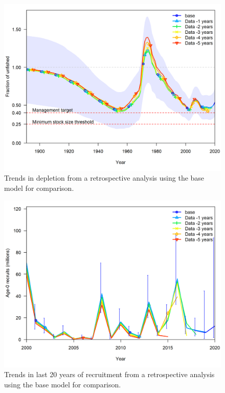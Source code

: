 \documentclass[11pt,
  english,
  a4paper,
]{article}
\begin{document}
\tagmcend\tagstructend


\begin{figure}
\centering
\includegraphics[width=1\textwidth,height=0.5\textheight]{figs/retro_base_depl.png}
\caption{Trends in depletion from a retrospective analysis using the base model for comparison.\label{fig:retroDEP}}
\end{figure}

\tagmcend\tagstructend


\begin{figure}
\centering
\includegraphics[width=1\textwidth,height=0.5\textheight]{figs/retro_base_rec.png}
\caption{Trends in last 20 years of recruitment from a retrospective analysis using the base model for comparison.\label{fig:retroREC}}
\end{figure}
\end{document}
